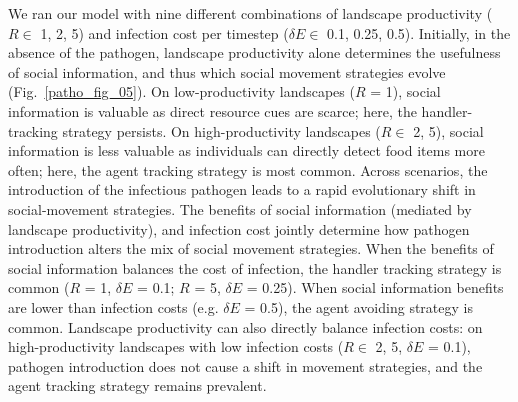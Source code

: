 We ran our model with nine different combinations of landscape productivity ($R \in $ 1, 2, 5) and infection cost per timestep ($\delta E \in$ 0.1, 0.25, 0.5).
Initially, in the absence of the pathogen, landscape productivity alone determines the usefulness of social information, and thus which social movement strategies evolve (Fig.~\ref{patho_fig_05}).
On low-productivity landscapes ($R$ = 1), social information is valuable as direct resource cues are scarce; here, the handler-tracking strategy persists.
On high-productivity landscapes ($R \in$ 2, 5), social information is less valuable as individuals can directly detect food items more often; here, the agent tracking strategy is most common.
Across scenarios, the introduction of the infectious pathogen leads to a rapid evolutionary shift in social-movement strategies.
The benefits of social information (mediated by landscape productivity), and infection cost jointly determine how pathogen introduction alters the mix of social movement strategies.
When the benefits of social information balances the cost of infection, the handler tracking strategy is common ($R$ = 1, $\delta E$ = 0.1; $R$ = 5, $\delta E$ = 0.25).
When social information benefits are lower than infection costs (e.g. $\delta E$ = 0.5), the agent avoiding strategy is common.
Landscape productivity can also directly balance infection costs: on high-productivity landscapes with low infection costs ($R \in$ 2, 5, $\delta E$ = 0.1), pathogen introduction does not cause a shift in movement strategies, and the agent tracking strategy remains prevalent.

